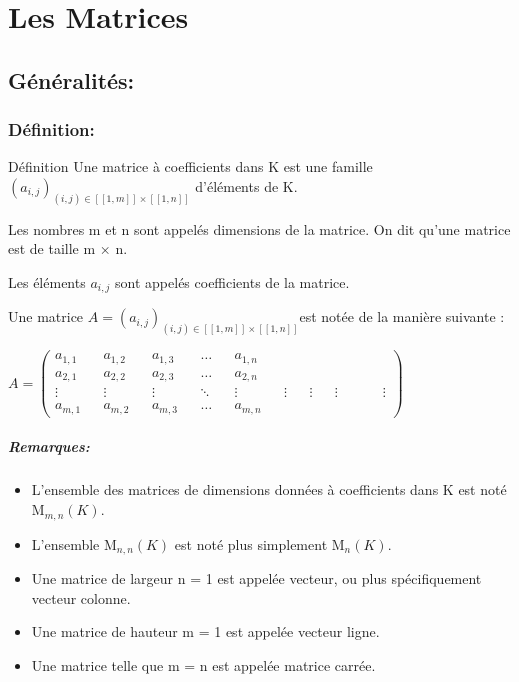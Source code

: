 \documentclass{book}
\begin{document}
\chapter{Les Matrices}
\section{Généralités: }
\subsection{Définition: }
\begin{Définition}[]{Définition}{}
Une matrice à coefficients dans K est une famille ${\displaystyle \left(a_{i,j}\right)_{(i,j)\in \left[\![1,m]\!\right]\times \left[\![1,n]\!\right]}}$ d'éléments de K.

Les nombres m et n sont appelés dimensions de la matrice. On dit qu'une matrice est de taille m × n.

Les éléments ${\displaystyle a_{i,j}}$ sont appelés coefficients de la matrice.

Une matrice ${\displaystyle A=\left(a_{i,j}\right)_{(i,j)\in \left[\![1,m]\!\right]\times \left[\![1,n]\!\right]}} $est notée de la manière suivante :


${\displaystyle A=
\begin{pmatrix}
a_{1,1} && a_{1,2} && a_{1,3} && \dots && a_{1,n}
\\a_{2,1} && a_{2,2} && a_{2,3} &&\dots && a_{2,n}
\\ \vdots &&\vdots &&\vdots &&\ddots && \vdots &&\vdots&&\vdots&&\vdots
&& && \vdots
\\a_{m,1} && a_{m,2} && a_{m,3}&&\dots && a_{m,n}
\end{pmatrix}}$
\end{Définition}
\paragraph{Remarques: }
\begin{itemize}
\item L’ensemble des matrices de dimensions données à coefficients dans K est noté ${\displaystyle \mathrm {M} _{m,n}\left(K\right)}$.

\item L'ensemble ${\displaystyle \mathrm {M} _{n,n}\left(K\right)}$ est noté plus simplement ${\displaystyle \mathrm {M} _{n}\left(K\right)}$.
    \item Une matrice de largeur n = 1 est appelée vecteur, ou plus spécifiquement vecteur colonne.
\item Une matrice de hauteur m = 1 est appelée vecteur ligne.
\item Une matrice telle que m = n est appelée matrice carrée.
\end{itemize}
\end{document}
